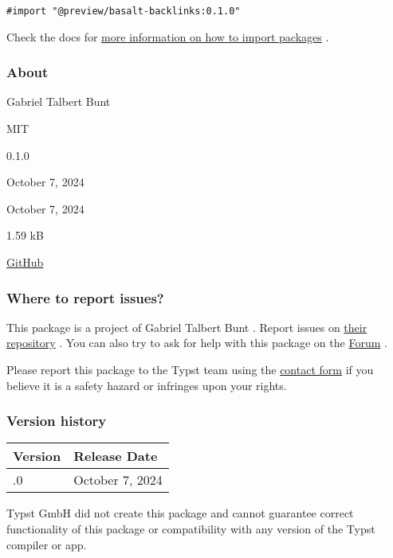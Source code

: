 \begin{verbatim}
#import "@preview/basalt-backlinks:0.1.0"
\end{verbatim}



Check the docs for
\href{https://typst.app/docs/reference/scripting/\#packages}{more
information on how to import packages} .

\subsubsection{About}\label{about}

\begin{description}
\tightlist
\item[Author :]
Gabriel Talbert Bunt
\item[License:]
MIT
\item[Current version:]
0.1.0
\item[Last updated:]
October 7, 2024
\item[First released:]
October 7, 2024
\item[Archive size:]
1.59 kB
\href{https://packages.typst.org/preview/basalt-backlinks-0.1.0.tar.gz}{\pandocbounded{}}
\item[Repository:]
\href{https://github.com/GabrielDTB/basalt-backlinks}{GitHub}
\end{description}

\subsubsection{Where to report issues?}\label{where-to-report-issues}

This package is a project of Gabriel Talbert Bunt . Report issues on
\href{https://github.com/GabrielDTB/basalt-backlinks}{their repository}
. You can also try to ask for help with this package on the
\href{https://forum.typst.app}{Forum} .

Please report this package to the Typst team using the
\href{https://typst.app/contact}{contact form} if you believe it is a
safety hazard or infringes upon your rights.

\label{versions}
\subsubsection{Version history}\label{version-history}

\begin{longtable}[]{@{}ll@{}}
\toprule\noalign{}
Version & Release Date \\
\midrule\noalign{}
\endhead
\bottomrule\noalign{}
\endlastfoot
0.1.0 & October 7, 2024 \\
\end{longtable}

Typst GmbH did not create this package and cannot guarantee correct
functionality of this package or compatibility with any version of the
Typst compiler or app.
